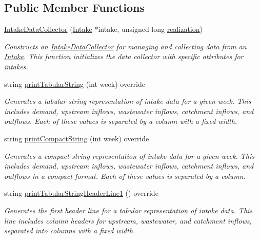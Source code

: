 \subsection*{Public Member Functions}
\begin{DoxyCompactItemize}
\item 
\mbox{\hyperlink{classIntakeDataCollector_a2ab4a81bec74a370c60c78609627e807}{Intake\+Data\+Collector}} (\mbox{\hyperlink{classIntake}{Intake}} $\ast$intake, unsigned long \mbox{\hyperlink{classDataCollector_a9ef2887466fe3123aa19ef956a219b96}{realization}})
\begin{DoxyCompactList}\small\item\em Constructs an \mbox{\hyperlink{classIntakeDataCollector}{Intake\+Data\+Collector}} for managing and collecting data from an \mbox{\hyperlink{classIntake}{Intake}}. This function initializes the data collector with specific attributes for intakes. \end{DoxyCompactList}\item 
string \mbox{\hyperlink{classIntakeDataCollector_ada2b88b7a05455cf6f2eebf82d37b3c5}{print\+Tabular\+String}} (int week) override
\begin{DoxyCompactList}\small\item\em Generates a tabular string representation of intake data for a given week. This includes demand, upstream inflows, wastewater inflows, catchment inflows, and outflows. Each of these values is separated by a column with a fixed width. \end{DoxyCompactList}\item 
string \mbox{\hyperlink{classIntakeDataCollector_ac39a40726fd4fe887425b24a10f04034}{print\+Compact\+String}} (int week) override
\begin{DoxyCompactList}\small\item\em Generates a compact string representation of intake data for a given week. This includes demand, upstream inflows, wastewater inflows, catchment inflows, and outflows in a compact format. Each of these values is separated by a column. \end{DoxyCompactList}\item 
string \mbox{\hyperlink{classIntakeDataCollector_ae17ab7e6c75e77f5981f6a682597bb5c}{print\+Tabular\+String\+Header\+Line1}} () override
\begin{DoxyCompactList}\small\item\em Generates the first header line for a tabular representation of intake data. This line includes column headers for upstream, wastewater, and catchment inflows, separated into columns with a fixed width. \end{DoxyCompactList}\item 

\end{DoxyCompactItemize}
